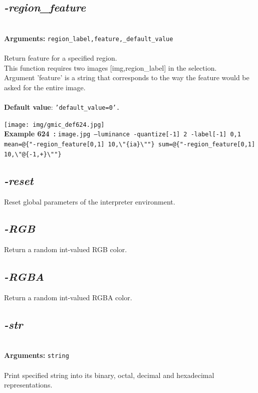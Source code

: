 \documentclass[a4paper,11pt,twoside]{book}
\begin{document}
\subsection{\emph{-region\_feature} }\vspace*{-0.5em}
~\\\textbf{Arguments: } 
{\small \texttt{region\_label,feature,\_default\_value}}\\~\\
Return feature for a specified region.
~\\This function requires two images [img,region\_label] in the selection.
~\\Argument 'feature' is a string that corresponds to the way the feature would
be asked for the entire image.
~\\~\\\textbf{Default value}: {\small \texttt{'default\_value=0'.}}
\begin{center}\texttt{[image: img/gmic\_def624.jpg]}\\
{\footnotesize \textbf{Example 624~:} \texttt{image.jpg --luminance -quantize[-1] 2 -label[-1] 0,1 mean=@\{"-region\_feature[0,1] 10,\textbackslash "\{ia\}\textbackslash ""\} sum=@\{"-region\_feature[0,1] 10,\textbackslash "@\{-1,+\}\textbackslash ""\}}}
\end{center}

\subsection{\emph{-reset} }\vspace*{-0.5em}
Reset global parameters of the interpreter environment.


\subsection{\emph{-RGB} }\vspace*{-0.5em}
Return a random int-valued RGB color.


\subsection{\emph{-RGBA} }\vspace*{-0.5em}
Return a random int-valued RGBA color.


\subsection{\emph{-str} }\vspace*{-0.5em}
~\\\textbf{Arguments: } 
{\small \texttt{string}}\\~\\
Print specified string into its binary, octal, decimal and hexadecimal representations.
\end{document}
